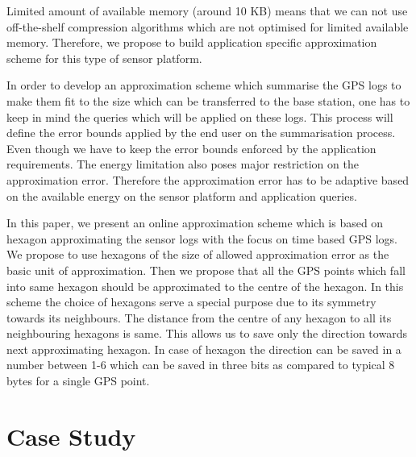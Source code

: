 \documentclass[conference]{IEEEtran}
\begin{document}

Limited amount of available memory (around 10 KB) means that we can not use off-the-shelf compression 
algorithms which are not optimised for limited available memory. Therefore, we propose to build 
application specific approximation scheme for this type of sensor platform.\

In order to develop an approximation scheme which summarise the GPS logs to make them fit to the 
size which can be transferred to the base station, one has to keep in mind the queries which will 
be applied on these logs. This process will define the error bounds applied by the end user on the 
summarisation process. Even though we have to keep the error bounds enforced by the application 
requirements. The energy limitation also poses major restriction on the approximation error. Therefore 
the approximation error has to be adaptive based on the available energy on the sensor platform and 
application queries.

In this paper, we present an online approximation scheme which is based on hexagon approximating 
the sensor logs with the focus on time based GPS logs. We propose to use hexagons of the size of 
allowed approximation error as the basic unit of approximation. Then we propose that all the GPS 
points which fall into same hexagon should be approximated to the centre of the hexagon. In this 
scheme the choice of hexagons serve a special purpose due to its symmetry towards its neighbours. 
The distance from the centre of any hexagon to all its neighbouring hexagons is same. This allows 
us to save only the direction towards next approximating hexagon. In case of hexagon the direction 
can be saved in a number between 1-6 which can be saved in three bits as compared to typical 8 bytes 
for a single GPS point.

\section{Case Study}
\end{document}
